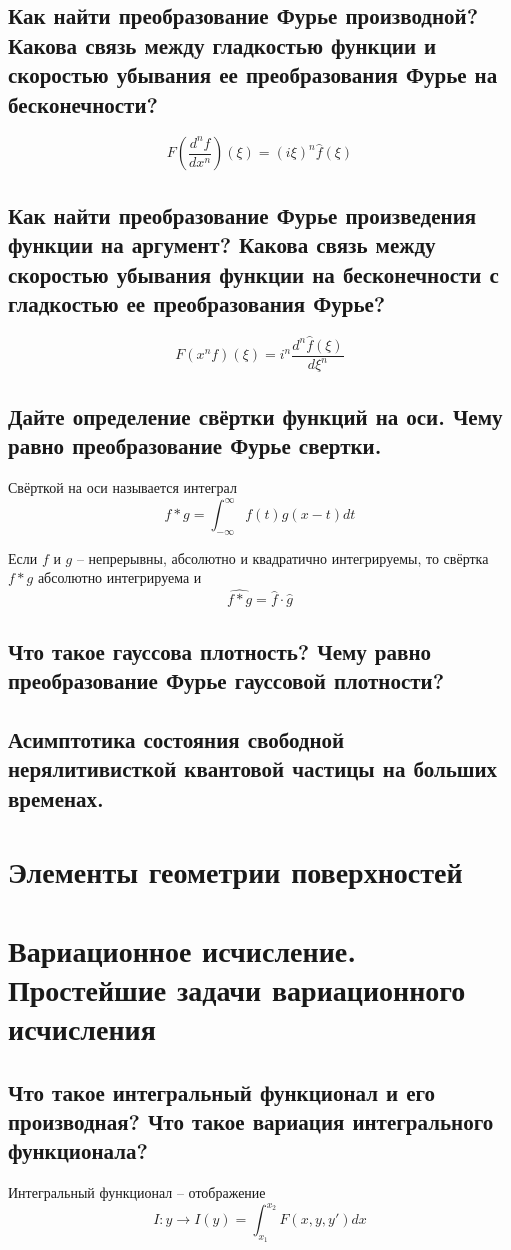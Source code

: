 \documentclass{article}
\begin{document}
\subsection{Как найти преобразование Фурье производной? Какова связь между гладкостью функции и скоростью убывания ее преобразования Фурье на бесконечности?}
\[ F\left(\frac{d^n f}{dx^n}\right)(\xi)=(i\xi)^n \widehat{f}(\xi) \]

\subsection{Как найти преобразование Фурье произведения функции на аргумент? Какова связь между скоростью убывания функции на бесконечности с гладкостью ее преобразования Фурье?}
\[ F\left(x^n f\right)(\xi)=i^n \frac{d^n \widehat{f}(\xi)}{d\xi^n} \]

\subsection{Дайте определение свёртки функций на оси. Чему равно преобразование Фурье свертки.}
Свёрткой на оси называется интеграл
\[ f * g = \int_{-\infty}^{\infty} f(t)g(x-t)dt \]

Если $ f $ и $ g $ -- непрерывны, абсолютно и квадратично интегрируемы, то свёртка $ f*g $ абсолютно интегрируема и
\[ \widehat{f*g} = \widehat{f} \cdot \widehat{g} \]

\subsection{Что такое гауссова плотность? Чему равно преобразование Фурье гауссовой плотности?}

\subsection{Асимптотика состояния свободной нерялитивисткой квантовой частицы на больших временах.}


\section{Элементы геометрии поверхностей}

\section{Вариационное исчисление. Простейшие задачи вариационного исчисления}

\subsection{Что такое интегральный функционал и его производная? Что такое вариация интегрального функционала?}
Интегральный функционал -- отображение
\[I: y \rightarrow I(y)=\int_{x_1}^{x_2} F(x, y, y')dx \]
\end{document}
